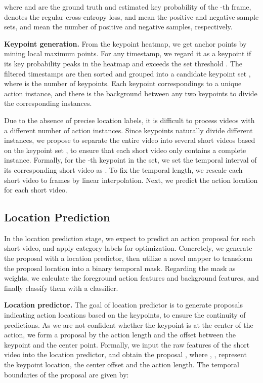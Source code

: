 \documentclass[final]{cvpr}
\begin{document}
where  and  are the ground truth and estimated key probability of the -th frame,  denotes the regular cross-entropy loss,  and  mean the positive and negative sample sets,  and  mean the number of positive and negative samples, respectively.




\textbf{Keypoint generation.}
From the keypoint heatmap, we get anchor points by mining local maximum points.
For any timestamp, we regard it as a keypoint if its key probability peaks in the heatmap and exceeds the set threshold . The filtered timestamps are then sorted and grouped into a candidate keypoint set , where  is the number of keypoints.
Each keypoint correspondings to a unique action instance, and there is the background between any two keypoints to divide the corresponding instances.





Due to the absence of precise location labels, it is difficult to process videos with a different number of action instances. Since keypoints naturally divide different instances, we propose to separate the entire video into several short videos based on the keypoint set , to ensure that each short video only contains a complete instance.
Formally, for the -th keypoint  in the set, we set the temporal interval of its corresponding short video as .
To fix the temporal length, we rescale each short video to  frames by linear interpolation.
Next, we predict the action location for each short video.






\subsection{Location Prediction}  \label{sec:Length Prediction}
In the location prediction stage, we expect to predict an action proposal for each short video, and apply category labels for optimization. Concretely, we generate the proposal with a location predictor, then utilize a novel mapper to transform the proposal location into a binary temporal mask. Regarding the mask as weights, we calculate the foreground action features and background features, and finally classify them with a classifier.





\textbf{Location predictor.}
The goal of location predictor is to generate proposals indicating action locations based on the keypoints, to ensure the continuity of predictions.
As we are not confident whether the keypoint is at the center of the action, we form a proposal by the action length and the offset between the keypoint and the center point.
Formally, we input the raw features  of the short video into the location predictor, and obtain the proposal , where , ,  represent the keypoint location, the center offset and the action length.
The temporal boundaries of the proposal are given by:
\end{document}
